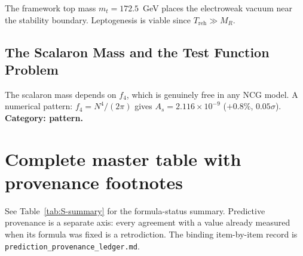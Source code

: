 \documentclass[12pt,a4paper]{article}
\theoremstyle{definition}
\begin{document}
The framework top mass $m_t = 172.5$~GeV places the electroweak vacuum near the stability boundary.  Leptogenesis is viable since $T_{\text{reh}} \gg M_R$.

\subsection{The Scalaron Mass and the Test Function Problem}

The scalaron mass depends on $f_4$, which is genuinely free in any NCG model.  A numerical pattern: $f_4 = N^4/(2\pi)$ gives $A_s = 2.116 \times 10^{-9}$ ($+0.8\%$, $0.05\sigma$).  \textbf{Category: pattern.}


\section{Complete master table with provenance footnotes}
\label{sec:S-master-table}

See Table~\ref{tab:S-summary} for the formula-status summary.  Predictive
provenance is a separate axis: every agreement with a value already measured
when its formula was fixed is a retrodiction.  The binding item-by-item
record is \texttt{prediction\_provenance\_ledger.md}.
\end{document}
